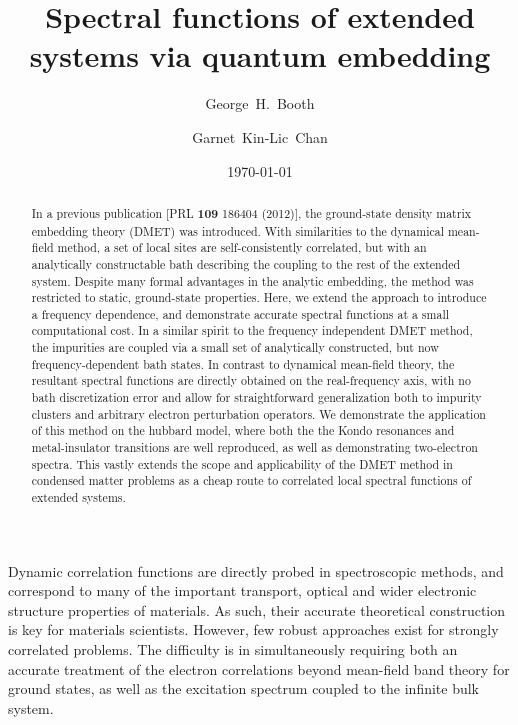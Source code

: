 \documentclass[aps,showpacs,twocolumn,nobibnotes]{revtex4}
\begin{document}
\title{Spectral functions of extended systems via quantum embedding}
\author{George~H.~Booth}
\author{Garnet~Kin-Lic~Chan}  

\begin{abstract}
In a previous publication [PRL {\bf 109} 186404 (2012)], the ground-state density matrix embedding theory (DMET) was introduced. With similarities 
to the dynamical mean-field method, a set of local sites are self-consistently correlated, but with an analytically constructable bath describing the
coupling to the rest of the extended system. 
Despite many formal advantages in the analytic embedding, the method was restricted to static, ground-state properties.
Here, we extend the approach to introduce a frequency dependence, and demonstrate accurate spectral functions at a small 
computational cost. In a similar spirit to the frequency independent DMET method, the impurities are coupled via a small set of 
analytically constructed, but now frequency-dependent bath states. In contrast to dynamical mean-field theory, the resultant 
spectral functions are directly obtained on the real-frequency axis, with no bath discretization error and allow for straightforward generalization both 
to impurity clusters and arbitrary electron perturbation operators. We demonstrate
the application of this method on the hubbard model, where both the the Kondo resonances and metal-insulator transitions are well reproduced, as well as 
demonstrating two-electron spectra. This vastly extends the scope and applicability 
of the DMET method in condensed matter problems as a cheap route to correlated local spectral functions of extended systems.
\end{abstract}
\date{\today}
\maketitle

Dynamic correlation functions are directly probed in spectroscopic methods, and correspond to many of the important transport, optical and 
wider electronic structure properties of materials. As such, their accurate theoretical construction is key for materials scientists. 
However, few robust approaches exist for strongly correlated problems. The difficulty is in simultaneously requiring both an accurate 
treatment of the electron correlations beyond mean-field band theory for 
ground states, as well as the excitation spectrum coupled to the infinite bulk
system.
\end{document}
